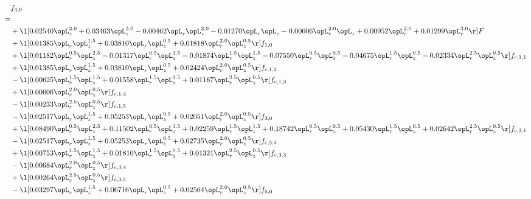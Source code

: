 \begin{alignat}{2} 
\label{eq:f_40_1} 
& f_{4,0} \nonumber \\ 
 = \\ 
& + \l[  0.02540 \opL_z^{2.0} +  0.03463 \opL_z^{3.0}   -0.00462 \opL_r \opL_z^{2.0}   -0.01270 \opL_r \opL_z   -0.00606 \opL_r^{2.0} \opL_z +  0.00952 \opL_r^{2.0} +  0.01299 \opL_r^{3.0}  \r] F \nonumber \\ 
& + \l[  0.01385 \opL_r \opL_z^{1.5} +  0.03810 \opL_r \opL_z^{0.5} +  0.01818 \opL_r^{2.0} \opL_z^{0.5}  \r] f_{1,0} \nonumber \\ 
& + \l[  0.01182 \opL_r^{0.5} \opL_z^{2.5}   -0.01317 \opL_r^{0.5} \opL_z^{1.5}   -0.01874 \opL_r^{1.5} \opL_z^{1.5}   -0.07550 \opL_r^{0.5} \opL_z^{0.5}   -0.04675 \opL_r^{1.5} \opL_z^{0.5}   -0.02334 \opL_r^{2.5} \opL_z^{0.5}  \r] f_{c,1,1} \nonumber \\ 
& + \l[  0.01385 \opL_r \opL_z^{1.5} +  0.03810 \opL_r \opL_z^{0.5} +  0.02424 \opL_r^{2.0} \opL_z^{0.5}  \r] f_{c,1,2} \nonumber \\ 
& - \l[  0.00625 \opL_r^{1.5} \opL_z^{1.5} +  0.01558 \opL_r^{1.5} \opL_z^{0.5} +  0.01167 \opL_r^{2.5} \opL_z^{0.5}  \r] f_{c,1,3} \nonumber \\ 
& + \l[  0.00606 \opL_r^{2.0} \opL_z^{0.5}  \r] f_{c,1,4} \nonumber \\ 
& - \l[  0.00233 \opL_r^{2.5} \opL_z^{0.5}  \r] f_{c,1,5} \nonumber \\ 
& - \l[  0.02517 \opL_r \opL_z^{1.5} +  0.05253 \opL_r \opL_z^{0.5} +  0.02051 \opL_r^{2.0} \opL_z^{0.5}  \r] f_{3,0} \nonumber \\ 
& + \l[  0.08490 \opL_r^{0.5} \opL_z^{2.5} +  0.11502 \opL_r^{0.5} \opL_z^{1.5} +  0.02259 \opL_r^{1.5} \opL_z^{1.5} +  0.18742 \opL_r^{0.5} \opL_z^{0.5} +  0.05430 \opL_r^{1.5} \opL_z^{0.5} +  0.02642 \opL_r^{2.5} \opL_z^{0.5}  \r] f_{c,3,1} \nonumber \\ 
& - \l[  0.02517 \opL_r \opL_z^{1.5} +  0.05253 \opL_r \opL_z^{0.5} +  0.02735 \opL_r^{2.0} \opL_z^{0.5}  \r] f_{c,3,2} \nonumber \\ 
& + \l[  0.00753 \opL_r^{1.5} \opL_z^{1.5} +  0.01810 \opL_r^{1.5} \opL_z^{0.5} +  0.01321 \opL_r^{2.5} \opL_z^{0.5}  \r] f_{c,3,3} \nonumber \\ 
& - \l[  0.00684 \opL_r^{2.0} \opL_z^{0.5}  \r] f_{c,3,4} \nonumber \\ 
& + \l[  0.00264 \opL_r^{2.5} \opL_z^{0.5}  \r] f_{c,3,5} \nonumber \\ 
& - \l[  0.03297 \opL_r \opL_z^{1.5} +  0.06716 \opL_r \opL_z^{0.5} +  0.02564 \opL_r^{2.0} \opL_z^{0.5}  \r] f_{5,0} \nonumber \\ 

\end{alignat}
